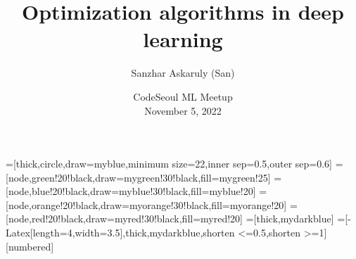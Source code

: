 \tikzset{>=latex} %
\usepackage{xcolor}
=[thick,circle,draw=myblue,minimum size=22,inner sep=0.5,outer sep=0.6]
=[node,green!20!black,draw=mygreen!30!black,fill=mygreen!25]
=[node,blue!20!black,draw=myblue!30!black,fill=myblue!20]
=[node,orange!20!black,draw=myorange!30!black,fill=myorange!20]
=[node,red!20!black,draw=myred!30!black,fill=myred!20]
=[thick,mydarkblue] %
=[-{Latex[length=4,width=3.5]},thick,mydarkblue,shorten <=0.5,shorten >=1]
\def\nstyle{int(\lay<\Nnodlen?min(2,\lay):3)} %
\DeclareMathOperator*{\argmax}{arg\,max}
\DeclareMathOperator*{\argmin}{arg\,min}
[numbered]
\AtBeginBibliography{\small}


\title[CodeSeoul] %
	{Optimization algorithms in deep learning}

\author[AI Research Paper Review] %
	{Sanzhar Askaruly (San)}


\date[November 5]
{CodeSeoul ML Meetup \\November 5, 2022}


    \begin{frame}
    \titlepage %
    \end{frame}


